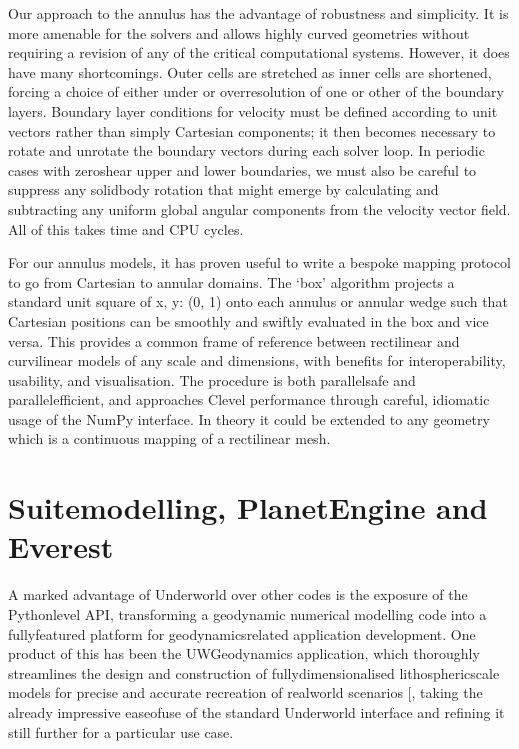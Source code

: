 \documentclass[letterpaper,10pt,english]{jupyterBook}
\begin{document}
\sphinxAtStartPar
Our approach to the annulus has the advantage of robustness and simplicity. It is more amenable for the solvers and allows highly curved geometries without requiring a revision of any of the critical computational systems. However, it does have many shortcomings. Outer cells are stretched as inner cells are shortened, forcing a choice of either under\sphinxhyphen{} or over\sphinxhyphen{}resolution of one or other of the boundary layers. Boundary layer conditions for velocity must be defined according to unit vectors rather than simply Cartesian components; it then becomes necessary to rotate and unrotate the boundary vectors during each solver loop. In periodic cases with zero\sphinxhyphen{}shear upper and lower boundaries, we must also be careful to suppress any solid\sphinxhyphen{}body rotation that might emerge by calculating and subtracting any uniform global angular components from the velocity vector field. All of this takes time and CPU cycles.

\sphinxAtStartPar
For our annulus models, it has proven useful to write a bespoke mapping protocol to go from Cartesian to annular domains. The ‘box’ algorithm projects a standard unit square of x, y: (0, 1) onto each annulus or annular wedge such that Cartesian positions can be smoothly and swiftly evaluated in the box and vice versa. This provides a common frame of reference between rectilinear and curvilinear models of any scale and dimensions, with benefits for interoperability, usability, and visualisation. The procedure is both parallel\sphinxhyphen{}safe and parallel\sphinxhyphen{}efficient, and approaches C\sphinxhyphen{}level performance through careful, idiomatic usage of the NumPy interface. In theory it could be extended to any geometry which is a continuous mapping of a rectilinear mesh.


\section{Suite\sphinxhyphen{}modelling, PlanetEngine and Everest}
\label{\detokenize{content/chapter_02_methods/section3:suite-modelling-planetengine-and-everest}}\label{\detokenize{content/chapter_02_methods/section3::doc}}
\sphinxAtStartPar
A marked advantage of Underworld over other codes is the exposure of the Python\sphinxhyphen{}level API, transforming a geodynamic numerical modelling code into a fully\sphinxhyphen{}featured platform for geodynamics\sphinxhyphen{}related application development. One product of this has been the UWGeodynamics application, which thoroughly streamlines the design and construction of fully\sphinxhyphen{}dimensionalised lithospheric\sphinxhyphen{}scale models for precise and accurate recreation of real\sphinxhyphen{}world scenarios {[}\sphinxcite{references:id71}{]}, taking the already impressive ease\sphinxhyphen{}of\sphinxhyphen{}use of the standard Underworld interface and refining it still further for a particular use case.
\end{document}

